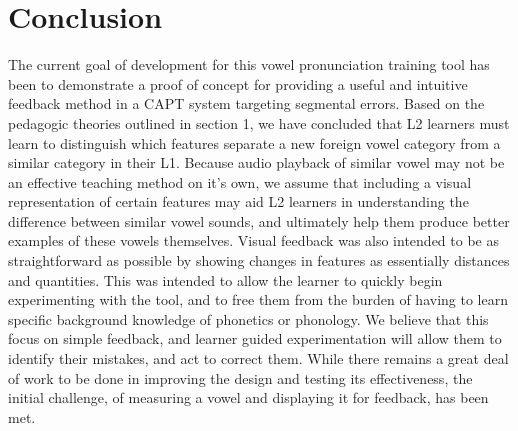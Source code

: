 \section{Conclusion}
The current goal of development for this vowel pronunciation training tool has been to demonstrate a proof of concept for providing a useful and intuitive feedback method in a CAPT system targeting segmental errors. Based on the pedagogic theories outlined in section 1, we have concluded that L2 learners must learn to distinguish which features separate a new foreign vowel category from a similar category in their L1. Because audio playback of similar vowel may not be an effective teaching method on it's own, we assume that including a visual representation of certain features may aid L2 learners in understanding the difference between similar vowel sounds, and ultimately help them produce better examples of these vowels themselves. Visual feedback was also intended to be as straightforward as possible by showing changes in features as essentially distances and quantities. This was intended to allow the learner to quickly begin experimenting with the tool, and to free them from the burden of having to learn specific background knowledge of phonetics or phonology. We believe that this focus on simple feedback, and learner guided experimentation will allow them to identify their mistakes, and act to correct them. While there remains a great deal of work to be done in improving the design and testing its effectiveness, the initial challenge, of measuring a vowel and displaying it for feedback, has been met.
